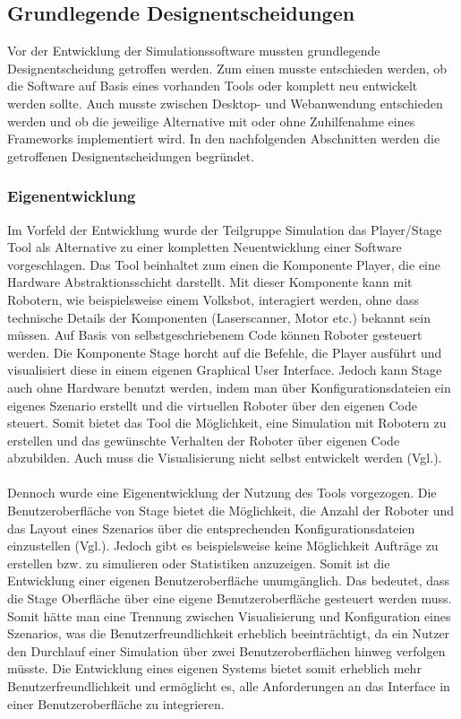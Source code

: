 \subsection{Grundlegende Designentscheidungen}
Vor der Entwicklung der Simulationssoftware mussten grundlegende Designentscheidung getroffen werden. Zum einen musste entschieden werden, ob die Software auf Basis eines vorhanden Tools oder komplett neu entwickelt werden sollte. Auch musste zwischen Desktop- und Webanwendung entschieden werden und ob die jeweilige Alternative mit oder ohne Zuhilfenahme eines Frameworks implementiert wird. In den nachfolgenden Abschnitten werden die getroffenen Designentscheidungen begründet.
\subsubsection{Eigenentwicklung}
Im Vorfeld der Entwicklung wurde der Teilgruppe Simulation das Player/Stage Tool als Alternative zu einer kompletten Neuentwicklung einer Software vorgeschlagen. Das Tool beinhaltet zum einen die Komponente Player, die eine Hardware Abstraktionsschicht darstellt. Mit dieser Komponente kann mit Robotern, wie beispielsweise einem Volksbot, interagiert werden, ohne dass technische Details der Komponenten (Laserscanner, Motor etc.) bekannt sein müssen. Auf Basis von selbstgeschriebenem Code können Roboter gesteuert werden. Die Komponente Stage horcht auf die Befehle, die Player ausführt und visualisiert diese in einem eigenen Graphical User Interface. Jedoch kann Stage auch ohne Hardware benutzt werden, indem man über Konfigurationsdateien ein eigenes Szenario erstellt und die virtuellen Roboter über den eigenen Code steuert. Somit bietet das Tool die Möglichkeit, eine Simulation mit Robotern zu erstellen und das gewünschte Verhalten der Roboter über eigenen Code abzubilden. Auch muss die Visualisierung nicht selbst entwickelt werden (Vgl.\cite{plstg}). 
\\\\
Dennoch wurde eine Eigenentwicklung der Nutzung des Tools vorgezogen. Die Benutzeroberfläche von Stage bietet die Möglichkeit, die Anzahl der Roboter und das Layout eines Szenarios über die entsprechenden Konfigurationsdateien einzustellen (Vgl.\cite{plstg}). Jedoch gibt es beispielsweise keine Möglichkeit Aufträge zu erstellen bzw. zu simulieren oder Statistiken anzuzeigen. Somit ist die Entwicklung einer eigenen Benutzeroberfläche unumgänglich. Das bedeutet, dass die Stage Oberfläche über eine eigene Benutzeroberfläche gesteuert werden muss. Somit hätte man eine Trennung zwischen Visualisierung und Konfiguration eines Szenarios, was die Benutzerfreundlichkeit erheblich beeinträchtigt, da ein Nutzer den Durchlauf einer Simulation über zwei Benutzeroberflächen hinweg verfolgen müsste. Die Entwicklung eines eigenen Systems bietet somit erheblich mehr Benutzerfreundlichkeit und ermöglicht es, alle Anforderungen an das Interface in einer Benutzeroberfläche zu integrieren. 
